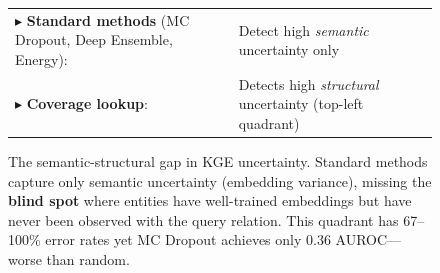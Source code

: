 \begin{figure}[t]
\vspace{0.3cm}
\begin{tabular}{ll}
\scriptsize $\blacktriangleright$ \textbf{Standard methods} (MC Dropout, Deep Ensemble, Energy): & \scriptsize Detect high \emph{semantic} uncertainty only \\
\scriptsize $\blacktriangleright$ \textbf{Coverage lookup}: & \scriptsize Detects high \emph{structural} uncertainty (top-left quadrant) \\
\end{tabular}

\caption{The semantic-structural gap in KGE uncertainty. Standard methods capture only semantic uncertainty (embedding variance), missing the \textbf{blind spot} where entities have well-trained embeddings but have never been observed with the query relation. This quadrant has 67--100\% error rates yet MC Dropout achieves only 0.36 AUROC---worse than random.}
\label{fig:quadrant}
\end{figure}
